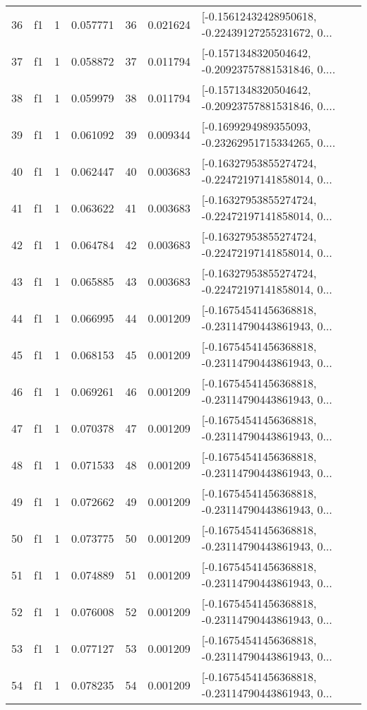 \begin{tabular}{lllrlrl}
36  &  f1 &   1 &  0.057771 &   36 &  0.021624 &  [-0.15612432428950618, -0.22439127255231672, 0... \\
37  &  f1 &   1 &  0.058872 &   37 &  0.011794 &  [-0.1571348320504642, -0.20923757881531846, 0.... \\
38  &  f1 &   1 &  0.059979 &   38 &  0.011794 &  [-0.1571348320504642, -0.20923757881531846, 0.... \\
39  &  f1 &   1 &  0.061092 &   39 &  0.009344 &  [-0.1699294989355093, -0.23262951715334265, 0.... \\
40  &  f1 &   1 &  0.062447 &   40 &  0.003683 &  [-0.16327953855274724, -0.22472197141858014, 0... \\
41  &  f1 &   1 &  0.063622 &   41 &  0.003683 &  [-0.16327953855274724, -0.22472197141858014, 0... \\
42  &  f1 &   1 &  0.064784 &   42 &  0.003683 &  [-0.16327953855274724, -0.22472197141858014, 0... \\
43  &  f1 &   1 &  0.065885 &   43 &  0.003683 &  [-0.16327953855274724, -0.22472197141858014, 0... \\
44  &  f1 &   1 &  0.066995 &   44 &  0.001209 &  [-0.16754541456368818, -0.23114790443861943, 0... \\
45  &  f1 &   1 &  0.068153 &   45 &  0.001209 &  [-0.16754541456368818, -0.23114790443861943, 0... \\
46  &  f1 &   1 &  0.069261 &   46 &  0.001209 &  [-0.16754541456368818, -0.23114790443861943, 0... \\
47  &  f1 &   1 &  0.070378 &   47 &  0.001209 &  [-0.16754541456368818, -0.23114790443861943, 0... \\
48  &  f1 &   1 &  0.071533 &   48 &  0.001209 &  [-0.16754541456368818, -0.23114790443861943, 0... \\
49  &  f1 &   1 &  0.072662 &   49 &  0.001209 &  [-0.16754541456368818, -0.23114790443861943, 0... \\
50  &  f1 &   1 &  0.073775 &   50 &  0.001209 &  [-0.16754541456368818, -0.23114790443861943, 0... \\
51  &  f1 &   1 &  0.074889 &   51 &  0.001209 &  [-0.16754541456368818, -0.23114790443861943, 0... \\
52  &  f1 &   1 &  0.076008 &   52 &  0.001209 &  [-0.16754541456368818, -0.23114790443861943, 0... \\
53  &  f1 &   1 &  0.077127 &   53 &  0.001209 &  [-0.16754541456368818, -0.23114790443861943, 0... \\
54  &  f1 &   1 &  0.078235 &   54 &  0.001209 &  [-0.16754541456368818, -0.23114790443861943, 0... \\

\end{tabular}

